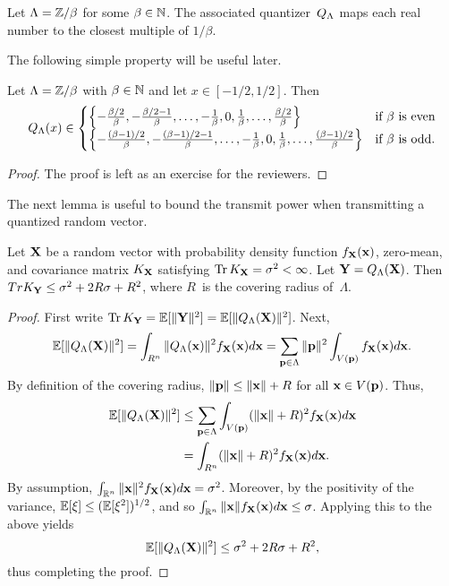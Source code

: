 \begin{example}
  Let $\Lambda = \mathbb{Z} / \beta$ for some $\beta \in {\mathbb{N}}$. The associated
  quantizer~${Q_{\Lambda}}$ maps each real number to the closest multiple of $1/\beta$.
\end{example}

The following simple property will be useful later.
\begin{proposition}
  Let $\Lambda = \mathbb{Z} / \beta$ with $\beta \in {\mathbb{N}}$ and let $x \in [-1/2, 1/2]$.
  Then
  \begin{equation*}
    {Q_{\Lambda}}(x) \in
    \begin{cases}
      \left\{ -\frac{\beta/2}{\beta}, -\frac{\beta/2 - 1}{\beta}, \dots, 
      -\frac{1}{\beta}, 0, \frac1\beta, \dots, \frac{\beta/2}{\beta} \right\}
      & \text{if $\beta$ is even} \\
      \left\{ -\frac{(\beta - 1)/2}{\beta}, -\frac{(\beta-1)/2 - 1}{\beta}, 
      \dots, -\frac1\beta, 0, \frac1\beta, \dots, \frac{(\beta-1)/2}{\beta}
      \right\}
      & \text{if $\beta$ is odd}.
    \end{cases}
  \end{equation*}
\end{proposition}

\begin{proof}
  The proof is left as an exercise for the reviewers.
\end{proof}

The next lemma is useful to bound the transmit power when transmitting a
quantized random vector.
\begin{lemma}
  \label{lem:latquantvar}
  Let $\mathbf{X}$ be a random vector with probability density function $f_{\mathbf{X}}(\mathbf{x})$,
  zero-mean, and covariance matrix $K_{\mathbf{X}}$ satisfying $\operatorname{Tr} K_{\mathbf{X}} = {\sigma^2} <
  \infty$. Let $\mathbf{Y} = {Q_{\Lambda}}(\mathbf{X})$. Then $Tr K_{\mathbf{Y}} \le {\sigma^2} + 2R\sigma + R^2$, 
  where $R$~is the covering radius of~$\Lambda$.
\end{lemma}

\begin{proof}
  First write $\operatorname{Tr} K_{\mathbf{Y}} = \mathbb{E}[\|\mathbf{Y}\|^2] = \mathbb{E}[\|{Q_{\Lambda}}(\mathbf{X})\|^2]$. Next,
  \begin{equation*}
    \mathbb{E}[\|{Q_{\Lambda}}(\mathbf{X})\|^2] = \int_{R^n} \|{Q_{\Lambda}}(\mathbf{x})\|^2 f_{\mathbf{X}}(\mathbf{x}) d\mathbf{x}
    = \sum_{\mathbf{p} \in \Lambda} \|\mathbf{p}\|^2 \int_{V(\mathbf{p})} f_{\mathbf{X}}(\mathbf{x}) d\mathbf{x}.
  \end{equation*}
  By definition of the covering radius, $\|\mathbf{p}\| \le \|\mathbf{x}\| + R$ for all $\mathbf{x} \in
  V(\mathbf{p})$. Thus,
  \begin{align*}
    \mathbb{E}[\|{Q_{\Lambda}}(\mathbf{X})\|^2] &\le \sum_{\mathbf{p} \in \Lambda} \int_{V(\mathbf{p})} (\|\mathbf{x}\| + R)^2
    f_{\mathbf{X}}(\mathbf{x}) d\mathbf{x} \\
    &= \int_{R^n} (\|\mathbf{x}\| + R)^2 f_{\mathbf{X}}(\mathbf{x}) d\mathbf{x}.
  \end{align*}
  By assumption, $\int_{\mathbb{R}^n} \|\mathbf{x}\|^2 f_{\mathbf{X}}(\mathbf{x}) d\mathbf{x} = {\sigma^2}$. Moreover, by the
  positivity of the variance, $\mathbb{E}[\xi] \le (\mathbb{E}[\xi^2])^{1/2}$, and so
  $\int_{\mathbb{R}^n} \|\mathbf{x}\| f_{\mathbf{X}}(\mathbf{x}) d\mathbf{x} \le \sigma$. Applying this to the above
  yields
  \begin{equation*}
    \mathbb{E}[\|{Q_{\Lambda}}(\mathbf{X})\|^2] \le {\sigma^2} + 2R\sigma + R^2,
  \end{equation*}
  thus completing the proof.
\end{proof}

